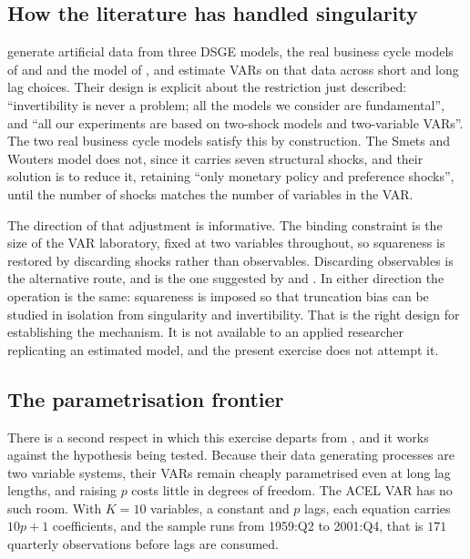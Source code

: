 \subsection{How the literature has handled singularity}

\citet{Long_Lag2025} generate artificial data from three DSGE models, the real business cycle
models of \citet{ChariKehoeMcGrattan2008} and \citet{CEV2006} and the model of \citet{SM2007},
and estimate VARs on that data across short and long lag choices. Their design is explicit
about the restriction just described: ``invertibility is never a problem; all the models we
consider are fundamental'', and ``all our experiments are based on two-shock models and
two-variable VARs''. The two real business cycle models satisfy this by construction. The
Smets and Wouters model does not, since it carries seven structural shocks, and their solution
is to reduce it, retaining ``only monetary policy and preference shocks'', until the number of
shocks matches the number of variables in the VAR.

The direction of that adjustment is informative. The binding constraint is the size of the VAR
laboratory, fixed at two variables throughout, so squareness is restored by discarding shocks
rather than observables. Discarding observables is the alternative route, and is the one
suggested by \citet{FVRRS2005} and \citet{Ravenna2007}. In either direction the operation is
the same: squareness is imposed so that truncation bias can be studied in isolation from
singularity and invertibility. That is the right design for establishing the mechanism. It is
not available to an applied researcher replicating an estimated model, and the present exercise
does not attempt it.

\subsection{The parametrisation frontier}

There is a second respect in which this exercise departs from \citet{Long_Lag2025}, and it
works against the hypothesis being tested. Because their data generating processes are two
variable systems, their VARs remain cheaply parametrised even at long lag lengths, and raising
$p$ costs little in degrees of freedom. The ACEL VAR has no such room. With $K=10$ variables, a
constant and $p$ lags, each equation carries $10p+1$ coefficients, and the sample runs from
1959:Q2 to 2001:Q4, that is $171$ quarterly observations before lags are consumed.

